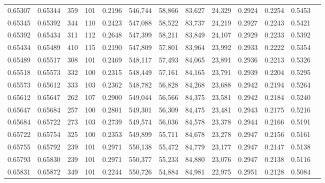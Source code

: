 \begin{tabular}{rrrrrrrrrrrrr}
0.65307 & 0.65344 &   359 & 101 &                                     0.2196 & 546,744 &  58,866 &  83,627 &  24,329 & 0.2924 & 0.2254 & 0.5453 \\
0.65345 & 0.65392 &   344 & 110 &                                     0.2423 & 547,088 &  58,522 &  83,737 &  24,219 & 0.2927 & 0.2243 & 0.5421 \\
0.65392 & 0.65434 &   311 & 112 &                                     0.2648 & 547,399 &  58,211 &  83,849 &  24,107 & 0.2929 & 0.2233 & 0.5392 \\
0.65434 & 0.65489 &   410 & 115 &                                     0.2190 & 547,809 &  57,801 &  83,964 &  23,992 & 0.2933 & 0.2222 & 0.5354 \\
0.65489 & 0.65517 &   308 & 101 &                                     0.2469 & 548,117 &  57,493 &  84,065 &  23,891 & 0.2936 & 0.2213 & 0.5326 \\
0.65518 & 0.65573 &   332 & 100 &                                     0.2315 & 548,449 &  57,161 &  84,165 &  23,791 & 0.2939 & 0.2204 & 0.5295 \\
0.65573 & 0.65612 &   333 & 103 &                                     0.2362 & 548,782 &  56,828 &  84,268 &  23,688 & 0.2942 & 0.2194 & 0.5264 \\
0.65612 & 0.65647 &   262 & 107 &                                     0.2900 & 549,044 &  56,566 &  84,375 &  23,581 & 0.2942 & 0.2184 & 0.5240 \\
0.65647 & 0.65684 &   257 & 100 &                                     0.2801 & 549,301 &  56,309 &  84,475 &  23,481 & 0.2943 & 0.2175 & 0.5216 \\
0.65684 & 0.65722 &   273 & 103 &                                     0.2739 & 549,574 &  56,036 &  84,578 &  23,378 & 0.2944 & 0.2166 & 0.5191 \\
0.65722 & 0.65754 &   325 & 100 &                                     0.2353 & 549,899 &  55,711 &  84,678 &  23,278 & 0.2947 & 0.2156 & 0.5161 \\
0.65755 & 0.65792 &   239 & 101 &                                     0.2971 & 550,138 &  55,472 &  84,779 &  23,177 & 0.2947 & 0.2147 & 0.5138 \\
0.65793 & 0.65830 &   239 & 101 &                                     0.2971 & 550,377 &  55,233 &  84,880 &  23,076 & 0.2947 & 0.2138 & 0.5116 \\
0.65831 & 0.65872 &   349 & 101 &                                     0.2244 & 550,726 &  54,884 &  84,981 &  22,975 & 0.2951 & 0.2128 & 0.5084 \\

\end{tabular}
